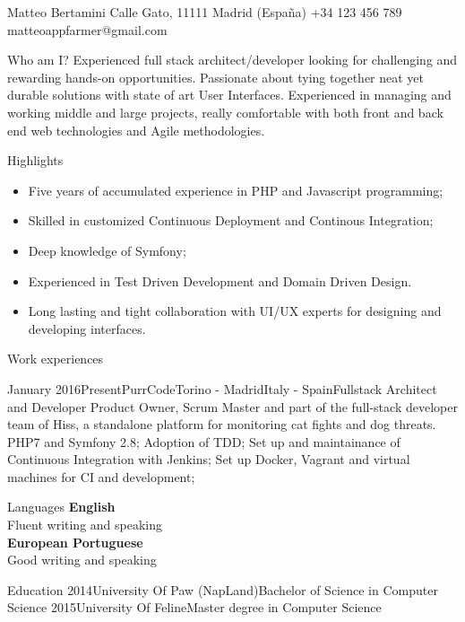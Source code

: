 \documentclass{bertuzcv}
\author{Matteo Bertamini}
\begin{document}
  \header
    {Matteo}
    {Bertamini}
    {Calle Gato, 11111 Madrid (España)}
    {+34 123 456 789}
    {matteoappfarmer@gmail.com}

  \noindent
  \begin{cvbox}{Who am I?}
    Experienced full stack architect/developer looking for challenging and
    rewarding hands-on opportunities. Passionate about tying together
    neat yet durable solutions with state of art User Interfaces. Experienced
    in managing and working middle and large projects, really comfortable with
    both front and back end web technologies and Agile methodologies.
  \end{cvbox}

  \begin{cvbox}{Highlights}
    \begin{itemize}[leftmargin=*,itemsep=-5pt]
        \item Five years of accumulated experience in PHP and Javascript programming;
        \item Skilled in customized Continuous Deployment and Continous Integration;
        \item Deep knowledge of Symfony;
        \item Experienced in Test Driven Development and Domain Driven Design.
        \item Long lasting and tight collaboration with UI/UX experts for designing and developing interfaces.
    \end{itemize}
  \end{cvbox}

  \noindent
  \begin{cvbox}{Work experiences}
    \begin{workExp}{January 2016}{Present}{PurrCode}{Torino - Madrid}{Italy - Spain}{Fullstack Architect and Developer}
      {Product Owner, Scrum Master and part of the full-stack developer team of Hiss, a standalone platform for monitoring cat fights and dog threats.}
      \workDetails
      {PHP7 and Symfony 2.8;}
      {Adoption of TDD;}
      {Set up and maintainance of Continuous Integration with Jenkins;}
      {Set up Docker, Vagrant and virtual machines for CI and development;}
    \end{workExp}
  \end{cvbox}

  \begin{cvbox}{Languages}
      {%
      \textbf{English}\\
      Fluent writing and speaking
      \\

      \textbf{European Portuguese}\\
      Good writing and speaking}
  \end{cvbox}

  \begin{cvbox}{Education}
    \eduItm
      {2014}{University Of Paw (NapLand)}{Bachelor of Science in Computer Science}
      {2015}{University Of Feline}{Master degree in Computer Science}
  \end{cvbox}
\end{document}
